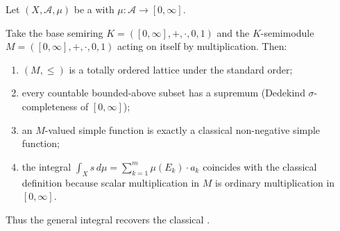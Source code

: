 \begin{definition} \label{definition:standard_nonnegative_lebesgue_integral_as_special_case}
Let $(X,\mathcal{A},\mu)$ be a  with $\mu : \mathcal{A} \to [0,\infty]$.

Take the base semiring $K = ([0,\infty], +, \cdot, 0, 1)$ and the $K$-semimodule $M = ([0,\infty], +, \cdot, 0, 1)$ acting on itself by multiplication. Then:
\begin{enumerate}
    \item $(M, \leq)$ is a totally ordered lattice under the standard order;
    \item every countable bounded-above subset has a supremum (Dedekind $\sigma$-completeness of $[0,\infty]$);
    \item an $M$-valued simple function is exactly a classical non-negative simple function;
    \item the integral $\int_X s\,d\mu = \sum_{k=1}^m \mu(E_k) \cdot a_k$ coincides with the classical definition because scalar multiplication in $M$ is ordinary multiplication in $[0,\infty]$.
\end{enumerate}

Thus the general integral recovers the classical .
\end{definition}
